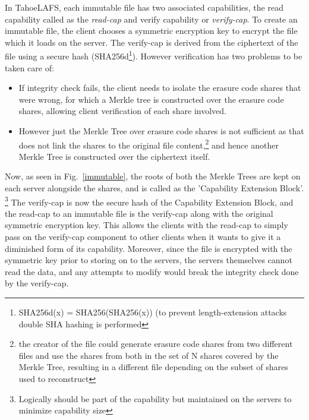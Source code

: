 In TahoeLAFS, each immutable file has two associated capabilities, the read capability called as the \textit{read-cap} and verify capability or 
\textit{verify-cap}. To create an immutable file, the client chooses a symmetric encryption key to encrypt the file which it loads on the server. The verify-cap is derived from the ciphertext of the file using a secure hash (SHA256d\footnote{SHA256d(x) = SHA256(SHA256(x)) (to prevent length-extension attacks double SHA hashing is performed}). However verification has two problems to be taken care of:
\begin{itemize}
\item If integrity check fails, the client needs to isolate the erasure code shares that were wrong, for which a Merkle tree is constructed over the erasure code shares, allowing client verification of each share involved.
\item However just the Merkle Tree over erasure code shares is not sufficient as that does not link the shares to the original file content,\footnote{the creator of the file could generate erasure code shares from two different files and use the shares from both in the set of N shares covered by the Merkle Tree, resulting in a different file depending on the subset of shares used to reconstruct} and hence another Merkle Tree is constructed over the ciphertext itself.
\end{itemize}
Now, as seen in Fig.~\ref{immutable}, the roots of both the Merkle Trees are kept on each server alongside the shares, and is called as the 'Capability Extension Block'. \footnote{Logically should be part of the capability but maintained on the servers to minimize capability size} The verify-cap is now the secure hash of the Capability Extension Block, and the read-cap to an immutable file is the verify-cap along with the original symmetric encryption key. This allows the clients with the read-cap to simply pass on the verify-cap component to other clients when it wants to give it a diminished form of its capability. Moreover, since the file is encrypted with the symmetric key prior to storing on to the servers, the servers themselves cannot read the data, and any attempts to modify would break the integrity check done by the verify-cap.

